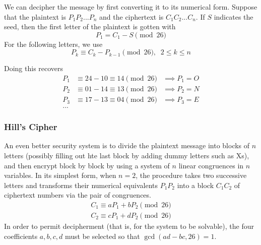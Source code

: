 \documentclass{article}
\theoremstyle{remark}
\theoremstyle{definition}
\begin{document}
We can decipher the message by first converting it to its numerical form. Suppose that the plaintext is $P_1 P_2 ... P_n$ and the ciphertext is $C_1 C_2 ... C_n$. If $S$ indicates the seed, then the first letter of the plaintext is gotten with
\[P_1 = C_1 - S \pmod{26}\]
For the following letters, we use 
\[P_k \equiv C_k - P_{k-1} \pmod{26}, \;\; 2 \leq k \leq n\]

Doing this recovers 
\begin{align*}
    P_1 &\equiv 24 - 10 \equiv 14 \pmod{26} & \implies P_1 = O\\
    P_2 &\equiv 01-14 \equiv 13 \pmod{26} & \implies P_2 = N\\
    P_3 &\equiv 17 - 13 \equiv 04 \pmod{26} & \implies P_3 = E \\
    ...
\end{align*}

\subsubsection{Hill's Cipher}
An even better security system is to divide the plaintext message into blocks of $n$ letters (possibly filling out hte last block by adding dummy letters such as Xs), and then encrypt block by block by using a system of $n$ linear congruences in $n$ variables. In its simplest form, when $n = 2$, the procedure takes two successive letters and transforms their numerical equivalents $P_1 P_2$ into a block $C_1 C_2$ of ciphertext numbers via the pair of congruences. 
\begin{align*}
    C_1 \equiv a P_1 + b P_2 \pmod{26} \\
    C_2 \equiv c P_1 + d P_2 \pmod{26}
\end{align*}
In order to permit decipherment (that is, for the system to be solvable), the four coefficients $a, b, c, d$ must be selected so that $\gcd(ad-bc, 26) = 1$. 
\end{document}
